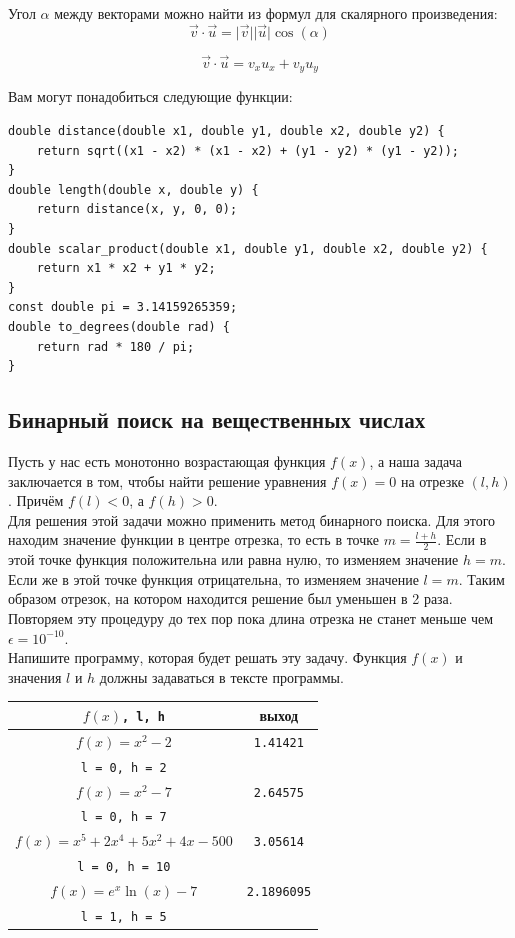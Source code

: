 \documentclass[10pt]{article}
\begin{document}
Угол $\alpha$ между векторами можно найти из формул для скалярного произведения:
\begin{equation*}
\vec{v} \cdot \vec{u} = \lvert \vec{v} \rvert  \lvert \vec{u} \rvert \cos(\alpha)
\end{equation*}

\begin{equation*}
\vec{v} \cdot \vec{u} = v_x u_x + v_y u_y
\end{equation*}

Вам могут понадобиться следующие функции:
\begin{lstlisting}
double distance(double x1, double y1, double x2, double y2) {
    return sqrt((x1 - x2) * (x1 - x2) + (y1 - y2) * (y1 - y2));
}
double length(double x, double y) {
    return distance(x, y, 0, 0);
}
double scalar_product(double x1, double y1, double x2, double y2) {
    return x1 * x2 + y1 * y2;
}
const double pi = 3.14159265359;
double to_degrees(double rad) {
    return rad * 180 / pi;
}
\end{lstlisting}



\subsection{Бинарный поиск на вещественных числах} 
Пусть у нас есть монотонно возрастающая функция $f(x)$, а наша задача заключается в том, чтобы найти решение уравнения $f(x) = 0$ на отрезке $(l, h)$. Причём $f(l) < 0$, а $f(h) > 0$. \\

Для решения этой задачи можно применить метод бинарного поиска. Для этого находим значение функции в центре отрезка, то есть в точке $m = \frac{l + h}{2}$. Если в этой точке функция положительна или равна нулю, то изменяем значение $h = m$. Если же в этой точке функция отрицательна, то изменяем значение $l = m$. Таким образом отрезок, на котором находится решение был уменьшен в 2 раза. Повторяем эту процедуру до тех пор пока длина отрезка не станет меньше чем $\epsilon = 10^{-10}$.\\
Напишите программу, которая будет решать эту задачу. Функция $f(x)$ и значения $l$ и $h$ должны задаваться в тексте программы.

\renewcommand{\arraystretch}{1.3}
\begin{center}
\begin{tabular}{ c | c }
 $f(x)$\texttt{, l, h} & выход \\ \hline
 $f(x) = x^2 - 2$  & \texttt{1.41421}  \\ 
 \texttt{l = 0, h = 2} &   \\ \hline
 $f(x) = x^2 - 7$  & \texttt{2.64575}  \\ 
 \texttt{l = 0, h = 7} &   \\ \hline
 $f(x) = x^5 + 2x^4 + 5x^2 +4x - 500$  & \texttt{3.05614}  \\ 
 \texttt{l = 0, h = 10} &   \\\hline
 $f(x) = e^x \ln(x) - 7$  & \texttt{2.1896095}  \\ 
 \texttt{l = 1, h = 5} &   \\
\end{tabular}
\end{center}
\renewcommand{\arraystretch}{1}
\end{document}
